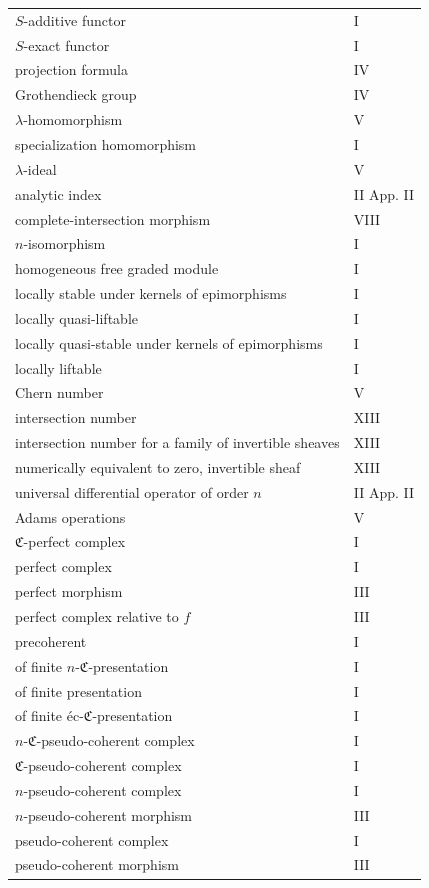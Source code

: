 \documentclass[12pt]{article}
\begin{document}
\begin{longtable}{p{8.5cm}l}
$S$-additive functor & I\\
$S$-exact functor & I\\
projection formula & IV\\
Grothendieck group & IV\\
$\lambda$-homomorphism & V\\
specialization homomorphism & I\\
$\lambda$-ideal & V\\
analytic index & II App. II\\
complete-intersection morphism & VIII\\
$n$-isomorphism & I\\
homogeneous free graded module & I\\
locally stable under kernels of epimorphisms & I\\
locally quasi-liftable & I\\
locally quasi-stable under kernels of epimorphisms & I\\
locally liftable & I\\
Chern number & V\\
intersection number & XIII\\
intersection number for a family of invertible sheaves & XIII\\
numerically equivalent to zero, invertible sheaf & XIII\\
universal differential operator of order $n$ & II App. II\\
Adams operations & V\\
$\mathfrak C$-perfect complex & I\\
perfect complex & I\\
perfect morphism & III\\
perfect complex relative to $f$ & III\\
precoherent & I\\
of finite $n$-$\mathfrak C$-presentation & I\\
of finite presentation & I\\
of finite éc-$\mathfrak C$-presentation & I\\
$n$-$\mathfrak C$-pseudo-coherent complex & I\\
$\mathfrak C$-pseudo-coherent complex & I\\
$n$-pseudo-coherent complex & I\\
$n$-pseudo-coherent morphism & III\\
pseudo-coherent complex & I\\
pseudo-coherent morphism & III\\

\end{longtable}
\end{document}
